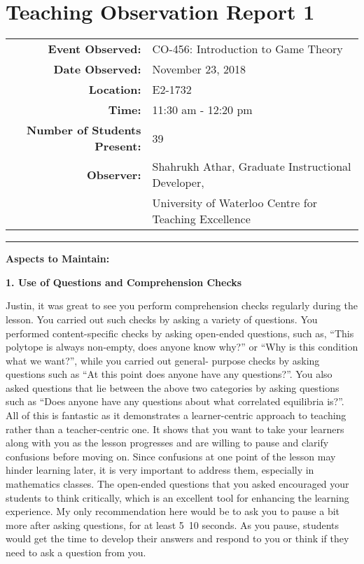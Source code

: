 \documentclass{article}
\begin{document}
\section{Teaching Observation Report 1}\label{sec:observation-report-1}
\begin{tabular}{r l}
\textbf{Event Observed:}&	CO-456: Introduction to Game Theory\\
\textbf{Date Observed:}&	November 23, 2018\\
\textbf{Location:}&	E2-1732\\
\textbf{Time:}&	11:30 am - 12:20 pm\\
\textbf{Number of Students Present:}&	39\\
\textbf{Observer:}&	Shahrukh Athar, Graduate Instructional Developer,\\
     &University of Waterloo Centre for Teaching Excellence\\
\end{tabular}

\rule{\linewidth}{0.25mm}
\textbf{Aspects to Maintain:}

\textbf{1. Use of Questions and Comprehension Checks}

Justin, it was great to see you perform comprehension checks regularly during the lesson. You carried out such checks by asking a variety of questions. You performed content-specific checks by asking open-ended questions, such as, “This polytope is always non-empty, does anyone know why?” or “Why is this condition what we want?”, while you carried out general- purpose checks by asking questions such as “At this point does anyone have any questions?”. You also asked questions that lie between the above two categories by asking questions such as “Does anyone have any questions about what correlated equilibria is?”. All of this is fantastic as it demonstrates a learner-centric approach to teaching rather than a teacher-centric one. It shows that you want to take your learners along with you as the lesson progresses and are willing to pause and clarify confusions before moving on. Since confusions at one point of the lesson may hinder learning later, it is very important to address them, especially in mathematics classes. The open-ended questions that you asked encouraged your students to think critically, which is an excellent tool for enhancing the learning experience. My only
recommendation here would be to ask you to pause a bit more after asking questions, for at least 5~10 seconds. As you pause, students would get the time to develop their answers and respond to you or think if they need to ask a question from you.
\end{document}
